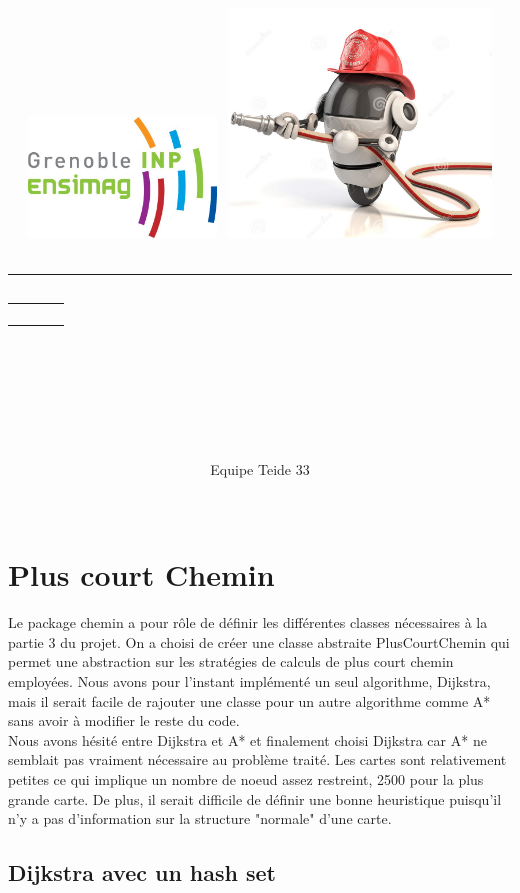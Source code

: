 \documentclass[12pt,a4paper]{article}
\title{
	\begin{flushleft}
		\includegraphics[width=5cm]{rapport/logo_ensimag.jpg} \hfill
		\includegraphics[width=7cm]{rapport/firebot.jpg} \\[40pt]
	\end{flushleft} 
	{\rule{15cm}{1mm}}\vspace{7mm}
	\begin{tabular}{p{4cm} r}
		& {\Huge {\bf \typedeprojet}} \\[20pt]
		& {\huge \nomduprojet}
	\end{tabular}\\
	\vspace{7mm}{\rule{15cm}{1mm}}\vspace{2mm} \\
	\hfill \large \dateduprojet \hspace{2cm}
	\renewcommand{\contentsname}{\LARGE \it Sommaire \hfill} %
	\setcounter{tocdepth}{2} %
	\tableofcontents
	\vfill
}
\author{
	\begin{tabular}{p{15cm}}
		\Large Equipe Teide 33
	\end{tabular} \\
	\hline
}
\date{}
\begin{document}
\maketitle
\thispagestyle{empty} %
\newpage


\section{Plus court Chemin}

Le package chemin a pour rôle de définir les différentes classes nécessaires à la partie 3 du projet. On a choisi de créer une classe abstraite PlusCourtChemin qui permet une abstraction sur les stratégies de calculs de plus court chemin employées. Nous avons pour l'instant implémenté un seul algorithme, Dijkstra, mais il serait facile de rajouter une classe pour un autre algorithme comme A* sans avoir à modifier le reste du code.\\

Nous avons hésité entre Dijkstra et A* et finalement choisi Dijkstra car A* ne semblait pas vraiment nécessaire au problème traité. Les cartes sont relativement petites ce qui implique un nombre de noeud assez restreint, 2500 pour la plus grande carte. De plus, il serait difficile de définir une bonne heuristique puisqu'il n'y a pas d'information sur la structure "normale" d'une carte.

\subsection{Dijkstra avec un hash set}
\end{document}
